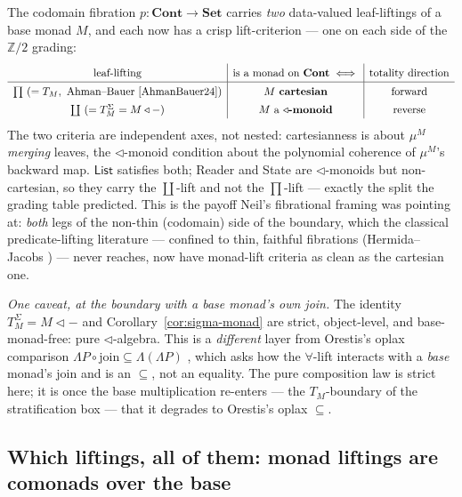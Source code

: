\documentclass[11pt,a4paper]{book}
\newcommand{\Set}{\mathbf{Set}}
\newcommand{\Cont}{\mathbf{Cont}}
\theoremstyle{plain}
\theoremstyle{definition}
\theoremstyle{remark}
\begin{document}
\begin{teachbox}
The codomain fibration $p\colon\Cont\to\Set$ carries \emph{two} data-valued leaf-liftings of a base
monad $M$, and each now has a crisp lift-criterion --- one on each side of the $\mathbb Z/2$ grading:
\[
\renewcommand{\arraystretch}{1.4}
\begin{array}{c|c|c}
 \text{leaf-lifting} & \text{is a monad on }\Cont\iff & \text{totality direction}\\\hline
 \prod\ (=T_{M},\ \text{Ahman--Bauer \cite{AhmanBauer24}}) & M\ \textbf{cartesian} & \text{forward}\\
 \coprod\ (=T^{\Sigma}_{M}=M\triangleleft-) & M\ \text{a }\textbf{$\triangleleft$-monoid} & \text{reverse}
\end{array}
\]
The two criteria are independent axes, not nested: cartesianness is about $\mu^{M}$ \emph{merging}
leaves, the $\triangleleft$-monoid condition about the polynomial coherence of $\mu^{M}$'s backward
map. $\mathsf{List}$ satisfies both; Reader and State are $\triangleleft$-monoids but non-cartesian, so
they carry the $\coprod$-lift and not the $\prod$-lift --- exactly the split the grading table
predicted. This is the payoff Neil's fibrational framing was pointing at: \emph{both} legs of the
non-thin (codomain) side of the boundary, which the classical predicate-lifting literature ---
confined to thin, faithful fibrations (Hermida--Jacobs \cite{HermidaJacobs98}) --- never reaches, now
have monad-lift criteria as clean as the cartesian one.

\smallskip
\emph{One caveat, at the boundary with a base monad's own join.} The identity
$T^{\Sigma}_{M}=M\triangleleft-$ and Corollary~\ref{cor:sigma-monad} are strict, object-level, and
base-monad-free: pure $\triangleleft$-algebra. This is a \emph{different} layer from Orestis's oplax
comparison $\Lambda P\circ\mathrm{join}\subseteq\Lambda(\Lambda P)$ \cite{OrestisAgda}, which asks how
the $\forall$-lift interacts with a \emph{base} monad's join and is an $\subseteq$, not an equality.
The pure composition law is strict here; it is once the base multiplication re-enters --- the
$T_{M}$-boundary of the stratification box --- that it degrades to Orestis's oplax $\subseteq$.
\end{teachbox}

\subsection{Which liftings, all of them: monad liftings are comonads over the base}
\label{sec:liftings-are-categories}
\end{document}
